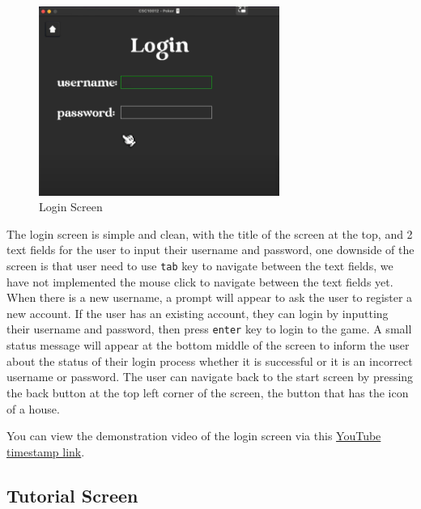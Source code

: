 \begin{figure}[H]
    \centering
    \includegraphics[width=0.7\textwidth]{figures/login_screen.png}
    \caption{Login Screen}
    \label{fig:login-screen}
\end{figure}

\hspace{1cm} The login screen is simple and clean, with the title of the screen at the top, and 2 text fields for the user to input their username and password, one downside of the screen is that user need to use \texttt{tab} key to navigate between the text fields, we have not implemented the mouse click to navigate between the text fields yet. When there is a new username, a prompt will appear to ask the user to register a new account. If the user has an existing account, they can login by inputting their username and password, then press \texttt{enter} key to login to the game. A small status message will appear at the bottom middle of the screen to inform the user about the status of their login process whether it is successful or it is an incorrect username or password. The user can navigate back to the start screen by pressing the back button at the top left corner of the screen, the button that has the icon of a house.

\vspace{0.5cm}

\hspace{1cm} You can view the demonstration video of the login screen via this \href{https://youtu.be/OA0v6xG21N4?t=165}{YouTube timestamp link}.

\subsection{Tutorial Screen}
\label{subsec:tutorial-screen}

